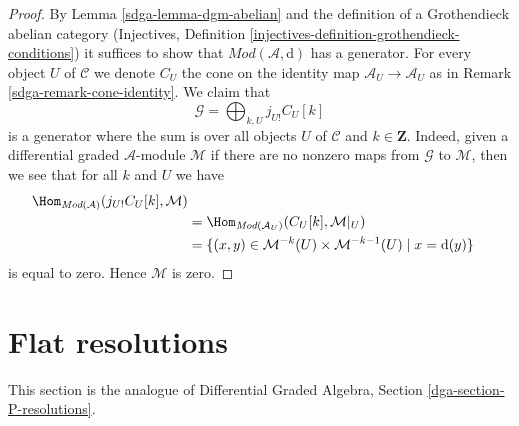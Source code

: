 \begin{proof}

By Lemma \ref{sdga-lemma-dgm-abelian} and the definition of a Grothendieck
abelian category
(Injectives, Definition \ref{injectives-definition-grothendieck-conditions})
it suffices to
show that $\textit{Mod}(\mathcal{A}, \text{d})$
has a generator. For every object $U$ of $\mathcal{C}$ we denote
$C_U$ the cone on the identity map $\mathcal{A}_U \to \mathcal{A}_U$
as in Remark \ref{sdga-remark-cone-identity}. We claim that
$$
\mathcal{G} = \bigoplus\nolimits_{k, U} j_{U!}C_U[k]
$$
is a generator where the sum is over all objects $U$ of $\mathcal{C}$
and $k \in \mathbf{Z}$. Indeed, given a
differential graded $\mathcal{A}$-module $\mathcal{M}$
if there are no nonzero maps from $\mathcal{G}$ to $\mathcal{M}$,
then we see that for all $k$ and $U$ we have
\begin{align*}
\Hom_{\textit{Mod}(\mathcal{A})}(j_{U!}C_U[k], \mathcal{M}) \\
& =
\Hom_{\textit{Mod}(\mathcal{A}_U)}(C_U[k], \mathcal{M}|_U) \\
& =
\{(x, y) \in \mathcal{M}^{-k}(U) \times \mathcal{M}^{-k - 1}(U) \mid
x = \text{d}(y)\}
\end{align*}
is equal to zero. Hence $\mathcal{M}$ is zero.
\end{proof}

\section{Flat resolutions}
\label{sdga-section-P-resolutions}
This section is the analogue of
Differential Graded Algebra, Section \ref{dga-section-P-resolutions}.

